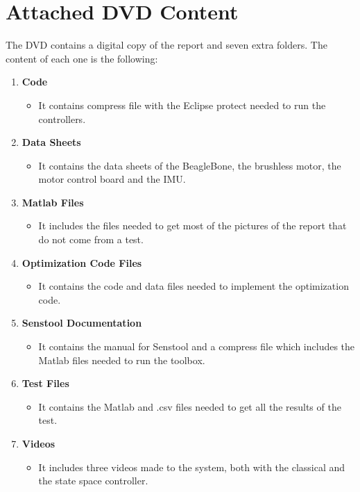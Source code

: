 \chapter{Attached DVD Content}

The DVD contains a digital copy of the report and seven extra folders. The content of each one is the following:
\begin{enumerate}
	\item \textbf{Code}
	\begin{itemize}
		\item[] It contains compress file with the Eclipse protect needed to run the controllers.
	\end{itemize}
	
	\item \textbf{Data Sheets}  
	\begin{itemize}
		\item[] It contains the data sheets of the BeagleBone, the brushless motor, the motor control board and the IMU.
	\end{itemize}
	
	\item \textbf{Matlab Files}  
	\begin{itemize}
		\item[] It includes the files needed to get most of the pictures of the report that do not come from a test.
	\end{itemize}
	
	\item \textbf{Optimization Code Files}  
	\begin{itemize}
		\item[] It contains the code and data files needed to implement the optimization code.
	\end{itemize}
	
	\item \textbf{Senstool Documentation}  
	\begin{itemize}
		\item[] It contains the manual for Senstool and a compress file which includes the Matlab files needed to run the toolbox.
	\end{itemize}	
	
	\item \textbf{Test Files}  
	\begin{itemize}
		\item[] It contains the Matlab and .csv files needed to get all the results of the test.
	\end{itemize}

	\item \textbf{Videos}  
	\begin{itemize}
		\item[] It includes three videos made to the system, both with the classical and the state space controller. 
	\end{itemize}
\end{enumerate}
